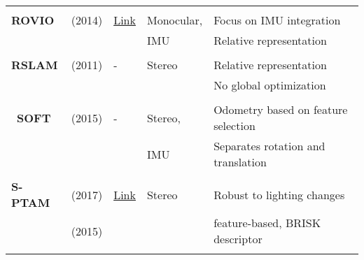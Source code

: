 {\begin{longtable}{l|l|l|l|l}
			&                                   &                                                                    &                       &\\
			\textbf{ROVIO}         & \cite{Bloesch2015} (2014)         & {\href{https://github.com/ethz-asl/rovio}{Link}}                   & Monocular,            & Focus on IMU integration\\
			&                                   &                                                                    & IMU                   & Relative representation\\
			&                                   &                                                                    &                       &\\
			\textbf{RSLAM}         & \cite{Mei2011} (2011)             & -                                                                  & Stereo                & Relative representation\\
			&                                   &                                                                    &                       & No global optimization \\
			&                                   &                                                                    &                       &\\\
			\textbf{SOFT}          & \cite{Cvisic2015} (2015)          & -                                                                  & Stereo,               & Odometry based on feature selection\\
			&                                   &                                                                    & IMU                   & Separates rotation and translation\\
			&                                   &                                                                    &                       &\\
			\textbf{S-PTAM}        & \cite{Pire2017} (2017)            & {\href{https://github.com/lrse/sptam}{Link}}                       & Stereo                & Robust to lighting changes\\
			& \cite{Pire2015} (2015)            &                                                                    &                       & feature-based, BRISK descriptor\\
			&                                   &                                                                    &                       &\\

\end{longtable}}
